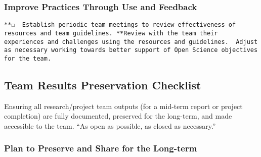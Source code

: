 \documentclass[
  letterpaper,
  DIV=11,
  numbers=noendperiod]{scrreport}
\begin{document}
\hypertarget{improve-practices-through-use-and-feedback}{%
\subsubsection{Improve Practices Through Use and
Feedback}\label{improve-practices-through-use-and-feedback}}

\begin{verbatim}
**☐  Establish periodic team meetings to review effectiveness of resources and team guidelines. **Review with the team their experiences and challenges using the resources and guidelines.  Adjust as necessary working towards better support of Open Science objectives for the team. 
\end{verbatim}

\hypertarget{team-results-preservation-checklist}{%
\subsection{Team Results Preservation
Checklist}\label{team-results-preservation-checklist}}

Ensuring all research/project team outputs (for a mid-term report or
project completion) are fully documented, preserved for the long-term,
and made accessible to the team. ``As open as possible, as closed as
necessary.''

\hypertarget{plan-to-preserve-and-share-for-the-long-term}{%
\subsubsection{Plan to Preserve and Share for the
Long-term}\label{plan-to-preserve-and-share-for-the-long-term}}
\end{document}
